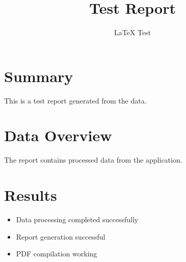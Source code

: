 \documentclass{article}
\title{Test Report}
\author{LaTeX Test}
\begin{document}
\maketitle
\section{Summary}
This is a test report generated from the data.
\section{Data Overview}
The report contains processed data from the application.
\section{Results}
\begin{itemize}
\item Data processing completed successfully
\item Report generation successful
\item PDF compilation working
\end{itemize}
\end{document}
